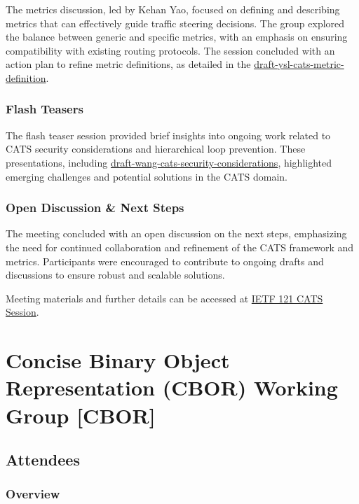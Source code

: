 \documentclass{article}
\begin{document}
The metrics discussion, led by Kehan Yao, focused on defining and describing metrics that can effectively guide traffic steering decisions. The group explored the balance between generic and specific metrics, with an emphasis on ensuring compatibility with existing routing protocols. The session concluded with an action plan to refine metric definitions, as detailed in the \href{https://datatracker.ietf.org/doc/html/draft-ysl-cats-metric-definition}{draft-ysl-cats-metric-definition}.

\subsubsection{Flash Teasers}

The flash teaser session provided brief insights into ongoing work related to CATS security considerations and hierarchical loop prevention. These presentations, including \href{https://datatracker.ietf.org/doc/html/draft-wang-cats-security-considerations}{draft-wang-cats-security-considerations}, highlighted emerging challenges and potential solutions in the CATS domain.

\subsubsection{Open Discussion \& Next Steps}

The meeting concluded with an open discussion on the next steps, emphasizing the need for continued collaboration and refinement of the CATS framework and metrics. Participants were encouraged to contribute to ongoing drafts and discussions to ensure robust and scalable solutions.

Meeting materials and further details can be accessed at \href{https://datatracker.ietf.org/meeting/121/session/cats}{IETF 121 CATS Session}.




\newpage

\section{Concise Binary Object Representation (CBOR) Working Group [CBOR]}

\subsection{Attendees}

\subsubsection{Overview}
\end{document}
